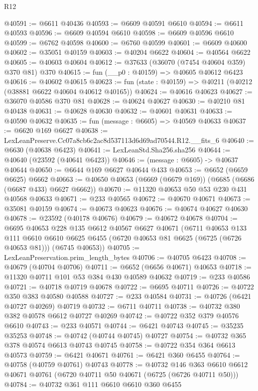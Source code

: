 \begin{lexlean}{R12}
\begin{coremodule}
@40591 := @6611 @40436
@40593 := @6609 @40591 @6610
@40594 := @6611 @40593
@40596 := @6609 @40594 @6610
@40598 := @6609 @40596 @6610
@40599 := @6762 @40598
@40600 := @6760 @40599
@40601 := @6609 @40600
@40602 := @35051 @40159
@40603 := @40204 @6622
@40604 := @40564 @6622
@40605 := @40603 @40604
@40612 := @37633 (@36070 (@7454 @40604 @359) @370 @81) @370
@40615 := fun (__p0 : @40159) => @40605 @40612 @6423
@40616 := @40602 @40615
@40623 := fun (state : @40159) => @40211 (@40212 (@38881 @6622 @40604 @40612 @40165))
@40624 := @40616 @40623
@40627 := @36070 @40586 @370 @81
@40628 := @40624 @40627
@40630 := @40210 @81 @40438
@40631 := @40628 @40630
@40632 := @40601 @40631
@40633 := @40590 @40632
@40635 := fun (message : @6605) => @40569 @40633
@40637 := @6620 @169 @6627
@40638 := LexLeanPreserve.Cc07a8cb6c2ac8d537113d6d69ad70544.R12.__fits_6
@40640 := @6630 (@40638 @6423)
@40641 := LexLeanStd.Sha256.sha256
@40644 := @40640 (@23592 (@40641 @6423))
@40646 := (message : @6605) -> @40637 @40644
@40650 := @6644 @169 @6627 @40644 @433
@40653 := @6652 (@6659 @6625) @6662
@40663 := @40650 @40653 (@6669 (@6679 @169)) (@6685 (@6686 (@6687 @433) @6627 @6662))
@40670 := @11320 @40653 @50 @53 @230 @431 @40568 @40633
@40671 := @233 @40565
@40672 := @40670 @40671
@40673 := @35081 @40159
@40674 := @40673 @40623
@40676 := @40674 @40627 @40630
@40678 := @23592 (@40178 @40676)
@40679 := @40672 @40678
@40704 := @6695
    @40653
    @228
    @135
    @6612
    @40567
    @6627
    @40671
    (@6711
      @40653
      @133
      @111
      @6610
      @6610
      @6625
      @6455
      (@6720 @40653 @81 @6625 (@6725 (@6726 @40653 @81)))
      (@6745 @40653))
@40705 := LexLeanPreservation.prim_length_bytes
@40706 := @40705 @6423
@40708 := @40679 (@40704 @40706)
@40711 := @6652 (@6656 @40671) @40653
@40718 := @11320 @40711 @101 @53 @384 @430 @40589 @40632
@40719 := @233 @40586
@40721 := @40718 @40719 @40678
@40722 := @6695 @40711
@40726 := @40722 @350 @383 @40580 @40588
@40727 := @233 @40584
@40731 := @40726 (@6421 @40727 @40269) @40719
@40732 := @6711 @40711
@40738 := @40732 @380 @382 @40578 @6612 @40727 @40269
@40742 := @40722 @352 @379 @40576 @6610
@40743 := @233 @40571
@40744 := @6421 @40743
@40745 := @35235 @35253
@40748 := @40742 (@40744 @40745) @40727
@40754 := @40732 @365 @378 @40574 @6613 @40743 @40745
@40758 := @40722 @354 @364 @6613 @40573
@40759 := @6421 @40671
@40761 := @6421 @360 @6455
@40764 := @40758 (@40759 @40761) @40743
@40778 := @40732
    @146
    @363
    @6610
    @6612
    @40671
    @40761
    (@6720 @40711 @50 @40671 (@6725 (@6726 @40711 @50)))
@40784 := @40732 @361 @111 @6610 @6610 @360 @6455

\end{coremodule}
\end{lexlean}
